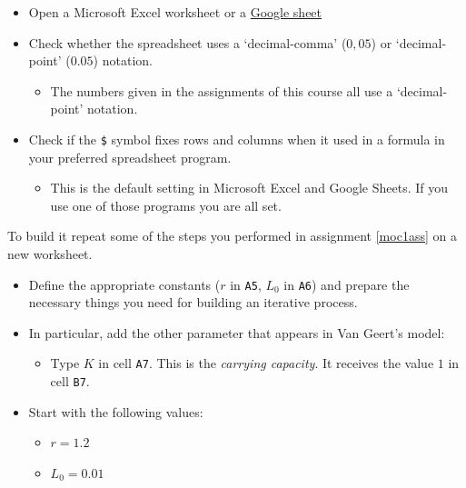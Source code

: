\documentclass[]{book}
\providecommand{\tightlist}{%
  \setlength{\itemsep}{0pt}\setlength{\parskip}{0pt}}
\begin{document}
\begin{itemize}
\tightlist
\item
  Open a Microsoft Excel worksheet or a
  \href{https://www.google.com/docs/about/}{Google sheet}
\item
  Check whether the spreadsheet uses a `decimal-comma' (\(0,05\)) or
  `decimal-point' (\(0.05\)) notation.

  \begin{itemize}
  \tightlist
  \item
    The numbers given in the assignments of this course all use a
    `decimal-point' notation.
  \end{itemize}
\item
  Check if the \texttt{\$} symbol fixes rows and columns when it used in
  a formula in your preferred spreadsheet program.

  \begin{itemize}
  \tightlist
  \item
    This is the default setting in Microsoft Excel and Google Sheets. If
    you use one of those programs you are all set.
  \end{itemize}
\end{itemize}

To build it repeat some of the steps you performed in assignment
\ref{moc1ass} on a new worksheet.

\begin{itemize}
\tightlist
\item
  Define the appropriate constants (\(r\) in \texttt{A5}, \(L_0\) in
  \texttt{A6}) and prepare the necessary things you need for building an
  iterative process.
\item
  In particular, add the other parameter that appears in Van Geert's
  model:

  \begin{itemize}
  \tightlist
  \item
    Type \(K\) in cell \texttt{A7}. This is the \emph{carrying
    capacity}. It receives the value \(1\) in cell \texttt{B7}.
  \end{itemize}
\item
  Start with the following values:

  \begin{itemize}
  \tightlist
  \item
    \(r = 1.2\)
  \item
    \(L_0 = 0.01\)
  \end{itemize}
\end{itemize}
\end{document}
